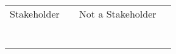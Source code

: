 \documentclass{standalone}
\begin{document}
\begin{tabular}{p{4cm} p{4cm} | p{4cm} p{4cm} }
\large Stakeholder & & \large Not a Stakeholder & \\
& & & \\
& & & \\
& & & \\
& & & \\
& & & \\
& & & \\
& & & \\
\end{tabular}
\end{document}
